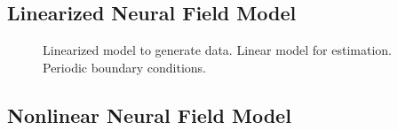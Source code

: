 \documentclass[conference]{IEEEtran}
\begin{document}
\subsection{Linearized Neural Field Model}

\begin{figure}[htbp]
	\centering
	\caption{Linearized model to generate data. Linear model for estimation. Periodic boundary conditions.}
	\label{fig:label}
\end{figure}

\subsection{Nonlinear Neural Field Model}
\end{document}
